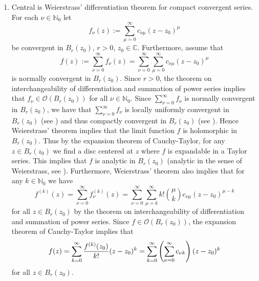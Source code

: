 \begin{enumerate}[label = \textbf{Exercise \arabic*.},wide = 0pt, itemsep=1.5ex]
	\item Central is Weierstrass' differentiation theorem for compact convergent series. For each $\nu \in \mathbb{N}_0$ let
		\begin{equation}
			f_\nu(z) := \sum_{\mu = 0}^\infty c_{\nu \mu}(z - z_0)^\mu
		\end{equation}
		\noindent be convergent in $B_r(z_0)$, $r > 0$, $z_0 \in \mathbb{C}$. Furthermore, assume that
		\begin{equation}
			f(z) := \sum_{\nu = 0}^\infty f_\nu(z) = \sum_{\nu = 0}^\infty \sum_{\mu = 0}^\infty c_{\nu \mu}(z - z_0)^\mu
		\end{equation}
		\noindent is normally convergent in $B_r(z_0)$. Since $r > 0$, the theorem on interchangeability of differentiation and summation of power series implies that $f_\nu \in \mathcal{O}(B_r(z_0))$ for all $\nu \in \mathbb{N}_0$. Since $\sum_{\nu = 0}^\infty f_\nu$ is normally convergent in $B_r(z_0)$, we have that $\sum_{\nu = 0}^\infty f_\nu$ is locally uniformly convergent in $B_r(z_0)$ (see \cite[92]{remmert2002funktionentheorie}) and thus compactly convergent in $B_r(z_0)$ (see \cite[85]{remmert2002funktionentheorie}). Hence Weierstrass' theorem implies that the limit function $f$ is holomorphic in $B_r(z_0)$. Thus by the expansion theorem of Cauchy-Taylor, for any $z \in B_r(z_0)$ we find a disc centered at $z$ where $f$ is expandable in a Taylor series. This implies that $f$ is analytic in $B_r(z_0)$ (analytic in the sense of Weierstrass, see \cite[210]{remmert2002funktionentheorie}). Furthermore, Weierstrass' theorem also implies that for any $k \in \mathbb{N}_0$ we have
		\begin{equation}
			f^{(k)}(z) = \sum_{\nu = 0}^\infty f_\nu^{(k)}(z) = \sum_{\nu = 0}^\infty \sum_{\mu = k}^\infty k! {\mu \choose k}c_{\nu \mu}(z - z_0)^{\mu - k} 
		\end{equation}
		\noindent for all $z \in B_r(z_0)$ by the theorem on interchangeability of differentiation and summation of power series. Since $f \in \mathcal{O}(B_r(z_0))$, the expansion theorem of Cauchy-Taylor implies that 
		\begin{equation}
			f(z) = \sum_{k = 0}^\infty \frac{f^{(k)}(z_0)}{k !} (z - z_0)^k = \sum_{k = 0}^\infty \del[4]{\sum_{\nu = 0}^\infty c_{\nu k}} (z - z_0)^k
		\end{equation}
		\noindent for all $z \in B_r(z_0)$.
\end{enumerate}
\printbibliography

